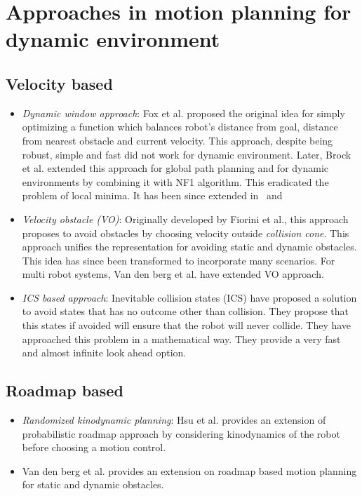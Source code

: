\documentclass[rnd]{mas_proposal}
\begin{document}
\section{Approaches in motion planning for dynamic environment}
\subsection{Velocity based}
\begin{itemize}
    \item \textit{Dynamic window approach}: Fox et al.\cite{fox1997dynamic} proposed the original idea for simply optimizing a function which balances robot's distance from goal, distance from nearest obstacle and current velocity. This approach, despite being robust, simple and fast did not work for dynamic environment. 
        Later, Brock et al.\cite{brock1999high} extended this approach for global path planning and for dynamic environments by combining it with NF1 algorithm. 
        This eradicated the problem of local minima. 
        It has been since extended in~\cite{seder2007dynamic} and~\cite{ogren2005convergent}
    \item \textit{Velocity obstacle (VO)}: Originally developed by Fiorini et al.\cite{fiorini1998motion}, this approach proposes to avoid obstacles by choosing velocity outside \textit{collision cone}.
        This approach unifies the representation for avoiding static and dynamic obstacles.
        This idea has since been transformed to incorporate many scenarios\cite{shiller2010nonlinear}\cite{owen2006a}\cite{owen2005motion}\cite{guy2009clearpath}. 
        For multi robot systems, Van den berg et al.\cite{van2008reciprocal}\cite{van2011reciprocal}\cite{van2006anytime} have extended VO approach.
    \item \textit{ICS based approach}: Inevitable collision states (ICS)\cite{fraichard2004inevitable}\cite{petti2005safe}\cite{martinez2009collision} have proposed a solution to avoid states that has no outcome other than collision. They propose that this states if avoided will ensure that the robot will never collide. They have approached this problem in a mathematical way. They provide a very fast and almost infinite look ahead option\cite{mohanan2018a}.

\end{itemize}

\subsection{Roadmap based}
\begin{itemize}
    \item \textit{Randomized kinodynamic planning}: Hsu et al.\cite{hsu2002randomized} provides an extension of probabilistic roadmap approach by considering kinodynamics of the robot before choosing a motion control.
    \item Van den berg et al.\cite{van2005roadmap} provides an extension on roadmap based motion planning for static and dynamic obstacles.
\end{itemize}
\end{document}
